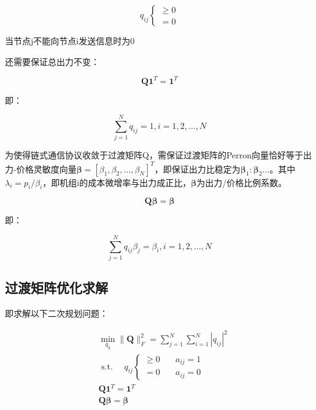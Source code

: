 \begin{equation}
    q_{i j}\left\{\begin{array}{l}
    {\geq 0} \\
    {=0}
    \end{array}\right.
\end{equation}

当节点j不能向节点i发送信息时为0

还需要保证总出力不变：

\begin{equation}
    \mathbf{Q} \mathbf{1}^{T}=\mathbf{1}^{T}
\end{equation}

即：

\begin{equation}
    \sum_{j=1}^{N} q_{i j}=1, i=1,2, \ldots, N
\end{equation}

为使得链式通信协议收敛于过渡矩阵Q，需保证过渡矩阵的Perron向量恰好等于出力-价格灵敏度向量$\boldsymbol{\beta}=\left[\beta_{1}, \beta_{2}, \ldots, \beta_{N}\right]^{T}$，即保证出力比稳定为$\boldsymbol{\beta}_{1}: \boldsymbol{\beta}_{2} \ldots$。其中$\lambda_{i}=p_{i} / \beta_{i}$，即机组i的成本微增率与出力成正比，$\boldsymbol{\beta}$为出力/价格比例系数。

\begin{equation}
    \mathbf{Q} \boldsymbol{\beta}=\boldsymbol{\beta}
\end{equation}

即：

\begin{equation}
    \sum_{j=1}^{N} q_{i j} \beta_{j}=\beta_{i}, i=1,2, \ldots, N
\end{equation}

\subsection{过渡矩阵优化求解}

即求解以下二次规划问题：

\begin{equation}
    \begin{aligned}
    &\min _{q_{y}}\|\mathbf{Q}\|_{F}^{2}=\sum_{j=1}^{N} \sum_{i=1}^{N}\left|q_{i j}\right|^{2}\\
    &\text { s.t. } \quad q_{i j}\left\{\begin{array}{ll}
    {\geq 0} & {\quad a_{i j}=1} \\
    {=0} & {\quad a_{i j}=0}
    \end{array}\right.\\
    &\mathbf{Q} \mathbf{1}^{T}=\mathbf{1}^{T}\\
    &\mathbf{Q} \boldsymbol{\beta}=\boldsymbol{\beta}
    \end{aligned}
\end{equation}

